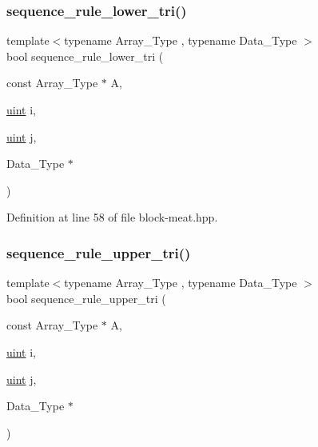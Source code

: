 \subsubsection{\texorpdfstring{sequence\+\_\+rule\+\_\+lower\+\_\+tri()}{sequence\_rule\_lower\_tri()}}
{\footnotesize\ttfamily template$<$typename Array\+\_\+\+Type , typename Data\+\_\+\+Type $>$ \\
bool sequence\+\_\+rule\+\_\+lower\+\_\+tri (\begin{DoxyParamCaption}\item[{const Array\+\_\+\+Type $\ast$}]{A,  }\item[{\hyperlink{typedefs_8hpp_a91ad9478d81a7aaf2593e8d9c3d06a14}{uint}}]{i,  }\item[{\hyperlink{typedefs_8hpp_a91ad9478d81a7aaf2593e8d9c3d06a14}{uint}}]{j,  }\item[{Data\+\_\+\+Type $\ast$}]{ }\end{DoxyParamCaption})\hspace{0.3cm}{\ttfamily [inline]}}



Definition at line 58 of file block-\/meat.\+hpp.

\mbox{\label{block-meat_8hpp_af5065fcabecdb2c3eedc5f95389aadfc}} 
\subsubsection{\texorpdfstring{sequence\+\_\+rule\+\_\+upper\+\_\+tri()}{sequence\_rule\_upper\_tri()}}
{\footnotesize\ttfamily template$<$typename Array\+\_\+\+Type , typename Data\+\_\+\+Type $>$ \\
bool sequence\+\_\+rule\+\_\+upper\+\_\+tri (\begin{DoxyParamCaption}\item[{const Array\+\_\+\+Type $\ast$}]{A,  }\item[{\hyperlink{typedefs_8hpp_a91ad9478d81a7aaf2593e8d9c3d06a14}{uint}}]{i,  }\item[{\hyperlink{typedefs_8hpp_a91ad9478d81a7aaf2593e8d9c3d06a14}{uint}}]{j,  }\item[{Data\+\_\+\+Type $\ast$}]{ }\end{DoxyParamCaption})\hspace{0.3cm}{\ttfamily [inline]}}



